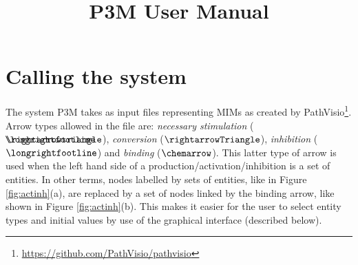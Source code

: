 \documentclass[a4paper]{article}
\title{P3M User Manual}
\author{}
\date{}
\renewcommand{\red}[1]{#1}
\begin{document}
\maketitle

\section{Calling the system}
\label{sec:call}

\red{The system  P3M takes as input files representing MIMs as created by 
PathVisio\footnote{\url{https://github.com/PathVisio/pathvisio}}. Arrow
types allowed in the file are: 
{\em necessary stimulation} %
 (~$\Nactiv$),  {\em
  conversion} ($\Aprod$), {\em inhibition}
($\Ainhib$) and {\em binding} ($\chemarrow$). This latter type of
arrow is used when the left hand side of a
production/activation/inhibition is a set of
entities. In other terms,  nodes labelled by sets of
entities, like in Figure \ref{fig:actinh}(a), are replaced by a set of
nodes linked by the binding arrow, like shown in
 Figure \ref{fig:actinh}(b). This makes it easier for the user to
 select entity types and initial values by use of the graphical
 interface (described below).
}
\end{document}
